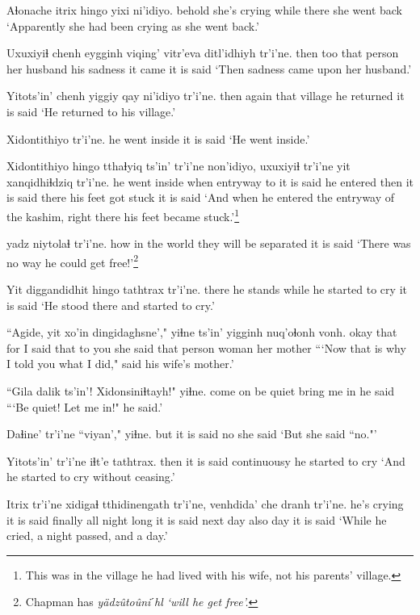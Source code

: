 \documentclass[12pt]{article}
\begin{document}
\gll Aɬonache itrix   hingo yixi ni'idiyo.
behold  {she's crying} while there {she went back}
\glt `Apparently she had been crying as she went back.'
\glend

\gll Uxuxiyiɬ chenh eygginh viqing' vitr'eva ditl'idhiyh tr'i'ne.
then  too {that person} {her husband} {his sadness} {it came}  {it is said}
\glt `Then sadness came upon her husband.'
\glend

\gll Yitots'in' chenh yiggiy qay ni'idiyo tr'i'ne.
then  again that village {he returned} {it is said}
\glt `He returned to his village.'
\glend

\gll Xidontithiyo tr'i'ne.
{he went inside} {it is said}
\glt `He went inside.'
\glend

\gll Xidontithiyo hingo tthaɬyiq ts'in' tr'i'ne non'idiyo, uxuxiyiɬ tr'i'ne yit xanqidhiɬdziq tr'i'ne.
{he went inside} when entryway to {it is said} {he entered} then  {it is said} there {his feet got stuck} {it is said}
\glt `And when he entered the entryway of the kashim, right there his feet became stuck.'\footnote{This was in the village he had lived with his wife, not his parents' village.}
\glend

 {yadz niytolaɬ}  tr'i'ne.
{how in the world}  {they will be separated} {it is said}
\glt `There was no way he could get free!'\footnote{Chapman has \em y\"adz\^uto\^uniˊhl \em `will he get free'.}
\glend

\gll Yit diggandidhit hingo tathtrax  tr'i'ne.
there {he stands}  while {he started to cry}  {it is said}
\glt `He stood there and started to cry.'
\glend

\gll ``Agide, yit xo'in dingidaghsne'," yiɬne ts'in' yigginh nuq'oɬonh vonh.
okay  that for {I said that to you} {she said} {}  {that person} woman  {her mother}
\glt ```Now that is why I told you what I did," said his wife's mother.'
\glend

\gll ``Gila dalik ts'in'! Xidonsiniɬtayh!" yiɬne.
{come on}  {be quiet} {} {bring me in} {he said}
\glt ```Be quiet! Let me in!" he said.'
\glend

\gll Daɬine' tr'i'ne ``viyan'," yiɬne.
but  {it is said} no  {she said}
\glt `But she said ``no."'
\glend

\gll Yitots'in' tr'i'ne iɬt'e  tathtrax.
then  {it is said} continuousy {he started to cry}
\glt `And he started to cry without ceasing.'
\glend

\gll Itrix  tr'i'ne xidigaɬ tthidinengath tr'i'ne, venhdida' che dranh tr'i'ne.
{he's crying} {it is said} finally {all night long}  {it is said} {next day} also day  {it is said}
\glt `While he cried, a night passed, and a day.'
\glend
\end{document}
